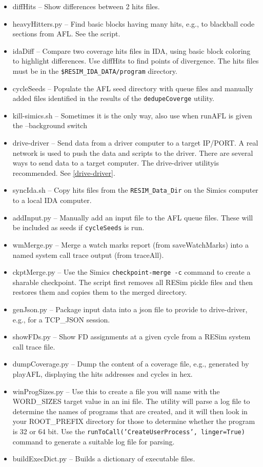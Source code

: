 \documentclass[titlepage]{article}
\begin{document}
\begin{itemize}
\item diffHits -- Show differences between 2 hits files.
\item heavyHitters.py -- Find basic blocks having many hits, e.g., to blackball code sections from AFL.  See the script.
\item idaDiff -- Compare two coverage hits files in IDA, using basic block coloring to highlight differences.  Use diffHits to find points
of divergence.  The hits files must be in the {\tt \$RESIM\_IDA\_DATA/program} directory.
\item cycleSeeds -- Populate the AFL seed directory with queue files and manually added files identified in the results of the {\tt dedupeCoverge} utility.
\item kill-simics.sh -- Sometimes it is the only way, also use when runAFL is given the --background switch
\item drive-driver -- Send data from a driver computer to a target IP/PORT.  A real network is used to push the data and scripts
to the driver.  There are several ways to send data to a target computer. The drive-driver utilityis recommended.  See \ref{drive-driver}.
\item syncIda.sh -- Copy hits files from the {\tt RESIM\_Data\_Dir} on the Simics computer to a local IDA computer.
\item addInput.py  -- Manually add an input file to the AFL queue files.  These will be included as seeds if {\tt cycleSeeds} is run.
\item wmMerge.py -- Merge a watch marks report (from saveWatchMarks) into a named system call trace output (from traceAll).
\item ckptMerge.py -- Use the Simics {\tt checkpoint-merge -c} command to create a sharable checkpoint.  The script first removes all RESim pickle files and
then restores them and copies them to the merged directory.
\item genJson.py -- Package input data into a json file to provide to drive-driver, e.g., for a TCP\_JSON session.
\item showFDs.py -- Show FD assignments at a given cycle from a RESim system call trace file.
\item dumpCoverage.py -- Dump the content of a coverage file, e.g., generated by playAFL, displaying the hits addresses and cycles in hex.
\item winProgSizes.py -- Use this to create a file you will name with the WORD\_SIZES target value in an ini file.  The utility will parse a log file 
to determine the names of programs that are created, and it will then look in your ROOT\_PREFIX directory for those to determine whether the program is 32 or
64 bit.  Use the {\tt runToCall('CreateUserProcess', linger=True)} command to generate a suitable log file for parsing.
\item buildExecDict.py -- Builds a dictionary of executable files.

\end{itemize}
\end{document}
